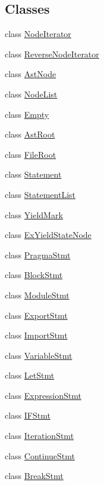 \subsection*{Classes}
\begin{DoxyCompactItemize}
\item 
class \hyperlink{classmocha_1_1_node_iterator}{NodeIterator}
\item 
class \hyperlink{classmocha_1_1_reverse_node_iterator}{ReverseNodeIterator}
\item 
class \hyperlink{classmocha_1_1_ast_node}{AstNode}
\item 
class \hyperlink{classmocha_1_1_node_list}{NodeList}
\item 
class \hyperlink{classmocha_1_1_empty}{Empty}
\item 
class \hyperlink{classmocha_1_1_ast_root}{AstRoot}
\item 
class \hyperlink{classmocha_1_1_file_root}{FileRoot}
\item 
class \hyperlink{classmocha_1_1_statement}{Statement}
\item 
class \hyperlink{classmocha_1_1_statement_list}{StatementList}
\item 
class \hyperlink{classmocha_1_1_yield_mark}{YieldMark}
\item 
class \hyperlink{classmocha_1_1_ex_yield_state_node}{ExYieldStateNode}
\item 
class \hyperlink{classmocha_1_1_pragma_stmt}{PragmaStmt}
\item 
class \hyperlink{classmocha_1_1_block_stmt}{BlockStmt}
\item 
class \hyperlink{classmocha_1_1_module_stmt}{ModuleStmt}
\item 
class \hyperlink{classmocha_1_1_export_stmt}{ExportStmt}
\item 
class \hyperlink{classmocha_1_1_import_stmt}{ImportStmt}
\item 
class \hyperlink{classmocha_1_1_variable_stmt}{VariableStmt}
\item 
class \hyperlink{classmocha_1_1_let_stmt}{LetStmt}
\item 
class \hyperlink{classmocha_1_1_expression_stmt}{ExpressionStmt}
\item 
class \hyperlink{classmocha_1_1_i_f_stmt}{IFStmt}
\item 
class \hyperlink{classmocha_1_1_iteration_stmt}{IterationStmt}
\item 
class \hyperlink{classmocha_1_1_continue_stmt}{ContinueStmt}
\item 
class \hyperlink{classmocha_1_1_break_stmt}{BreakStmt}

\end{DoxyCompactItemize}
